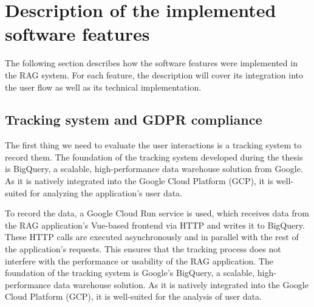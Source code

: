 \documentclass[
	english,
	ruledheaders=section,%
	class=report,%
	thesis={type=bachelor},%
	accentcolor=1b,%
	custommargins=true,%
	marginpar=false,%
	parskip=half-,%
	fontsize=11pt,%
	DIV=14,
]{tudapub}
\begin{document}
\section{Description of the implemented software features}
The following section describes how the software features were implemented in the RAG system. For each feature, the description will cover its integration into the user flow as well as its technical implementation.
\subsection{Tracking system and GDPR compliance}
The first thing we need to evaluate the user interactions is a tracking system to record them. The foundation of the tracking system developed during the thesis is BigQuery, a scalable, high-performance data warehouse solution from Google. As it is natively integrated into the Google Cloud Platform (GCP), it is well-suited for analyzing the application's user data.

To record the data, a Google Cloud Run service is used, which receives data from the RAG application's Vue-based frontend via HTTP and writes it to BigQuery. These HTTP calls are executed asynchronously and in parallel with the rest of the application's requests. This ensures that the tracking process does not interfere with the performance or usability of the RAG application.
The foundation of the tracking system is Google's BigQuery, a scalable, high-performance data warehouse solution. As it is natively integrated into the Google Cloud Platform (GCP), it is well-suited for the analysis of user data.
\end{document}
